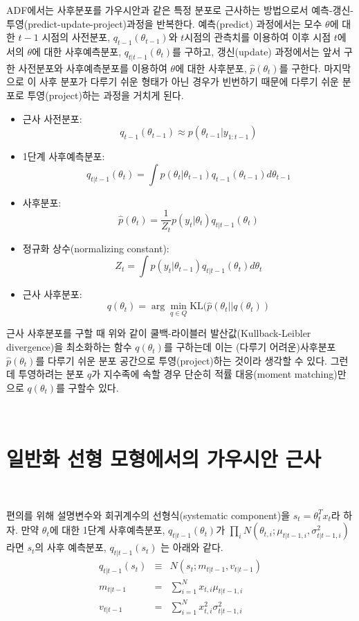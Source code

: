 \documentclass[oneside,b5paper,11pt]{book}
\theoremstyle{plain}
\theoremstyle{definition}
\theoremstyle{remark}
\theoremstyle{definition}
\numberwithin{equation}{chapter}
\begin{document}
 ADF에서는 사후분포를 가우시안과 같은 특정 분포로 근사하는 방법으로서 예측-갱신-투영(predict-update-project)과정을 반복한다. 예측(predict) 과정에서는 모수 $\theta$에 대한 $t-1$ 시점의 사전분포, $q_{t-1}(\theta_{t-1})$와 $t$시점의 관측치를 이용하여 이후 시점 $t$에서의 $\theta$에 대한 사후예측분포, $q_{t|t-1}(\theta_{t})$를 구하고, 갱신(update) 과정에서는 앞서 구한 사전분포와 사후예측분포를 이용하여 $\theta$에 대한 사후분포, $\hat{p}(\theta_t)$를 구한다. 마지막으로 이 사후 분포가 다루기 쉬운 형태가 아닌 경우가 빈번하기 때문에 다루기 쉬운 분포로 투영(project)하는 과정을 거치게 된다.

\begin{itemize}
\item 근사 사전분포:
$$q_{t-1}(\theta_{t-1}) \approx p(\theta_{t-1}|y_{1:t-1})$$
\item 1단계 사후예측분포:
$$q_{t|t-1}(\theta_t) = \int p(\theta_t | \theta_{t-1}) q_{t-1}(\theta_{t-1}) d\theta_{t-1}$$
\item 사후분포:
$$\hat{p}(\theta_t) = \frac{1}{Z_t}p(y_t | \theta_t)q_{t|t-1}(\theta_t)$$
\item 정규화 상수(normalizing constant):
$$Z_t = \int p(y_t | \theta_{t-1})q_{t|t-1}(\theta_{t})d\theta_{t}$$
\item 근사 사후분포:
$$q(\theta_t) = \arg\min_{q \in Q} \mathrm{KL}(\hat{p}(\theta_t || q(\theta_t)) $$
\end{itemize}

근사 사후분포를 구할 때 위와 같이 쿨백-라이블러 발산값(Kullback-Leibler divergence)을 최소화하는 함수 $q(\theta_t)$를 구하는데 이는 (다루기 어려운)사후분포$\hat{p}(\theta_t)$를 다루기 쉬운 분포 공간으로 투영(project)하는 것이라 생각할 수 있다. 그런데 투영하려는 분포 $q$가 지수족에 속할 경우 단순히 적률 대응(moment matching)만으로 $q(\theta_t)$를 구할수 있다.\citep{Murphy2012}



{}\
\section{일반화 선형 모형에서의 가우시안 근사}
{}\

편의를 위해 설명변수와 회귀계수의 선형식(systematic component)을 $s_t=\theta_t^T x_t$라 하자. 만약 $\theta_t$에 대한 1단계 사후예측분포, $q_{t|t-1}(\theta_t)$가 \newline
$\prod_i N(\theta_{t,i};\mu_{t|t-1,i},\sigma^2_{t|t-1,i})$라면 $s_t$의 사후 예측분포, $q_{t|t-1}(s_t)$ 는 아래와 같다.
\begin{eqnarray}
   q_{t|t-1}(s_{t}) &\equiv& N(s_t;m_{t|t-1}, {v}_{t|t-1})
\\ m_{t|t-1} &=& \sum^N_{i=1}x_{t,i}\mu_{t|t-1,i}
\\ {v}_{t|t-1} &=& \sum^N_{i=1}x^2_{t,i}{\sigma}^2_{t|t-1,i}
\end{eqnarray}
\end{document}
